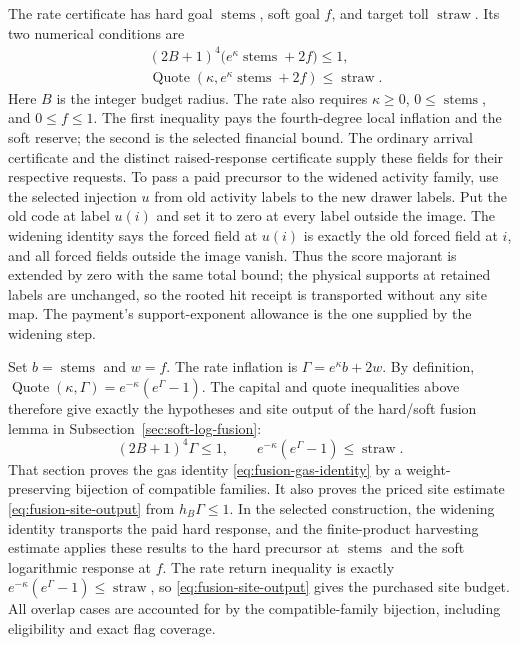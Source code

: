 The rate certificate has hard goal $\operatorname{stems}$, soft goal $f$,
and target toll $\operatorname{straw}$. Its two numerical conditions are
\begin{align}
 &(2B+1)^4\bigl(e^\kappa\operatorname{stems}+2f\bigr)\leq1,
 \label{eq:ex-lattice-multi-capital}\\
 &\operatorname{Quote}(\kappa,
      e^\kappa\operatorname{stems}+2f)\leq\operatorname{straw}.
 \label{eq:ex-lattice-multi-rate}
\end{align}
Here $B$ is the integer budget radius. The rate also requires
$\kappa\geq0$, $0\leq\operatorname{stems}$, and $0\leq f\leq1$.
The first inequality pays the fourth-degree local inflation and the soft
reserve; the second is the selected financial bound. The ordinary arrival
certificate and the distinct raised-response certificate supply these fields
for their respective requests. To pass a paid precursor to the widened activity family, use the selected
injection $u$ from old activity labels to the new drawer labels. Put the old
code at label $u(i)$ and set it to zero at every label outside the image.
The widening identity says the forced field at $u(i)$ is exactly the old
forced field at $i$, and all forced fields outside the image vanish. Thus
the score majorant is extended by zero with the same total bound; the
physical supports at retained labels are unchanged, so the rooted hit
receipt is transported without any site map. The payment's support-exponent
allowance is the one supplied by the widening step.

Set $b=\operatorname{stems}$ and $w=f$. The rate inflation is
$\Gamma=e^\kappa b+2w$. By definition,
$\operatorname{Quote}(\kappa,\Gamma)=e^{-\kappa}(e^\Gamma-1)$.
The capital and quote inequalities above therefore give exactly the
hypotheses and site output of the hard/soft fusion lemma in
Subsection~\ref{sec:soft-log-fusion}:
\[
 (2B+1)^4\Gamma\leq1,\qquad
 e^{-\kappa}(e^\Gamma-1)\leq\operatorname{straw}.
\]
That section proves the gas identity
\eqref{eq:fusion-gas-identity} by a weight-preserving bijection of
compatible families. It also proves the priced site estimate
\eqref{eq:fusion-site-output} from $h_B\Gamma\leq1$. In the selected
construction, the widening identity transports the paid hard response, and the
finite-product harvesting estimate applies these results to the hard
precursor at $\operatorname{stems}$ and the soft logarithmic response at
$f$. The rate return inequality is exactly
$e^{-\kappa}(e^\Gamma-1)\leq\operatorname{straw}$, so
\eqref{eq:fusion-site-output} gives the purchased site budget. All overlap
cases are accounted for by the compatible-family bijection, including
eligibility and exact flag coverage.

